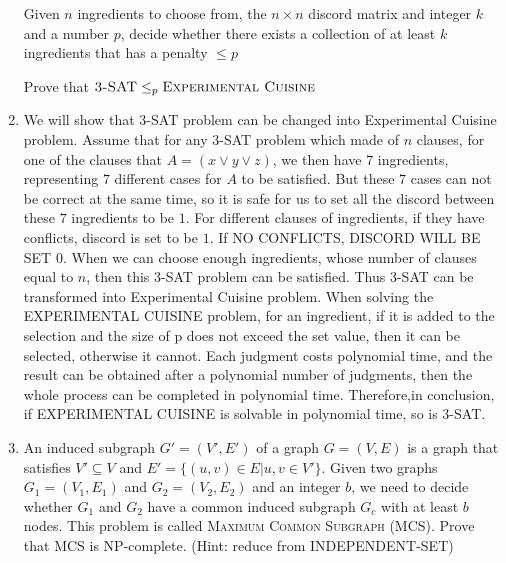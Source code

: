 \documentclass[12pt,a4paper]{article}
\makeatletter
\newtheorem*{solution}{Solution}
\theoremstyle{definition}
\renewenvironment{solution}[1][Solution] {\par\pushQED{\qed}\normalfont\topsep6\p@\@plus6\p@\relax\trivlist\item[\hskip\labelsep\bfseries#1\@addpunct{.}]\ignorespaces}{\popQED\endtrivlist\@endpefalse} \makeatother
\makeatother
\begin{document}
\begin{enumerate}
        Given $n$ ingredients to choose from, the $n\times n$ discord matrix and integer $k$ and a number $p$,  decide whether there exists a collection of at least $k$ ingredients that has a penalty $\leqslant p$

    Prove that $\textsc{3-SAT}\leq_p\textsc{Experimental Cuisine}$
    
    \begin{solution}
    We will show that 3-SAT problem can be changed into Experimental Cuisine problem. Assume that for any 3-SAT problem which made of $n$ clauses, %
    for one of the clauses that $A=\left(x \vee y \vee z \right)$, we then have $7$ ingredients, representing $7$ different cases for $A$ to be satisfied. But these $7$ cases can not be correct at the same time, so it is safe for us to set all the discord between these $7$ ingredients to be $1$. For different clauses of ingredients, if they have conflicts, discord is set to be $1$. If NO CONFLICTS, DISCORD WILL BE SET $0$. When we can choose enough ingredients, whose number of clauses equal to $n$, then this 3-SAT problem can be satisfied. Thus 3-SAT can be transformed into Experimental Cuisine problem. When solving the EXPERIMENTAL CUISINE problem, for an ingredient, if it is added to the selection and the size of p does not exceed the set value, then it can be selected, otherwise it cannot. Each judgment costs polynomial time, and the result can be obtained after a polynomial number of judgments, then the whole process can be completed in polynomial time. Therefore,in conclusion, if EXPERIMENTAL CUISINE is solvable in polynomial time, so is 3-SAT.

    
    \end{solution}
    
    
    \item An induced subgraph $G'=(V',E')$ of a graph $G=(V,E)$ is a graph that satisfies $V'\subseteq V$ and $E' =\{(u,v)\in E| u,v\in V'\}$. Given two graphs $G_1=(V_1,E_1)$ and $G_2=(V_2,E_2)$ and an integer $b$, we need to decide whether $G_1$ and $G_2$ have a common induced subgraph $G_c$ with at least $b$ nodes. This problem is called \textsc{Maximum Common Subgraph} (MCS). Prove that MCS is NP-complete. (Hint: reduce from \textsc{INDEPENDENT-SET})


\end{enumerate}
\end{document}
